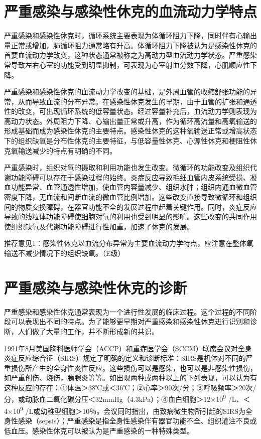 \section{严重感染与感染性休克的血流动力学特点}

严重感染和感染性休克时，循环系统主要表现为体循环阻力下降，同时伴有心输出量正常或增加，肺循环阻力通常略有升高。体循环阻力下降被认为是感染性休克的首要血流动力学改变，这种状态通常被称之为高动力型血流动力学状态。严重感染常导致左右心室的功能受到明显抑制，可表现为心室射血分数下降，心肌顺应性下降。

严重感染和感染性休克的血流动力学改变的基础，是外周血管的收缩舒张功能的异常，从而导致血流的分布异常。在感染性休克发生的早期，由于血管的扩张和通透性的改变，可出现循环系统的低容量状态。经过容量补充后，血流动力学则表现为高动力状态。外周阻力下降、心输出量正常或升高，作为循环高流量和高氧输送的形成基础而成为感染性休克的主要特点。感染性休克的这种氧输送正常或增高状态下的组织缺氧是分布性休克的主要特征，与低容量性休克、心源性休克和梗阻性休克氧输送减少的特点有明确的不同。

严重感染时，组织对氧的摄取和利用功能也发生改变。微循环的功能改变及组织代谢功能障碍可以存在于感染过程的始终。炎症反应导致毛细血管内皮系统受损、凝血功能异常、血管通透性增加，使血管内容量减少、组织水肿；组织内通血微血管密度下降，无血流和间断血流的微血管比例增加。这些改变直接导致微循环和组织间的物质交换障碍，在器官功能不全的发展过程中起着关键作用。同时，炎症反应导致的线粒体功能障碍使细胞对氧的利用也受到明显的影响。这些改变的共同作用使组织缺氧及代谢功能障碍进行性加重，加速了休克的发展。

推荐意见1：感染性休克以血流分布异常为主要血流动力学特点，应注意在整体氧输送不减少情况下的组织缺氧。（E级）

\section{严重感染与感染性休克的诊断}

严重感染和感染性休克通常表现为一个进行性发展的临床过程。这个过程的不同阶段可以表现出不同的特点。为了能够更早期对严重感染和感染性休克进行识别和诊断，人们做了大量的工作，并不断形成新的共识。

1991年8月美国胸科医师学会（ACCP）和重症医学会（SCCM）联席会议对全身炎症反应综合征（SIRS）规定了明确的定义和诊断标准：SIRS是机体对不同的严重损伤所产生的全身性炎性反应。这些损伤可以是感染，也可以是非感染性损伤，如严重创伤、烧伤，胰腺炎等等。如出现两种或两种以上的下列表现，可以认为有这种反应的存在：①体温＞38℃或＜36℃；②心率＞90次/分；③呼吸频率＞20次/分，或动脉血二氧化碳分压＜32mmHg（4.3kPa）；④血白细胞＞12×10\textsuperscript{9}
/L、＜4×10\textsuperscript{9}
/L或幼稚型细胞＞10％。会议同时指出，由致病微生物所引起的SIRS为全身性感染（sepsis）；严重感染是指全身性感染伴有器官功能不全、组织灌注不良或低血压。感染性休克可以被认为是严重感染的一种特殊类型。


